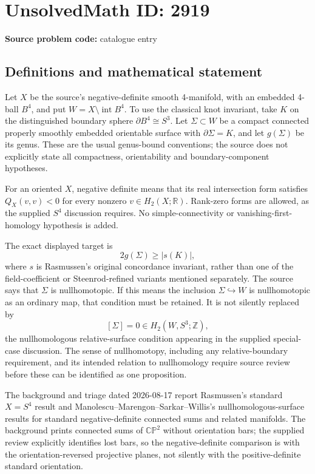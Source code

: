 \documentclass[11pt]{article}
\newcommand{\Z}{\mathbb{Z}}
\newcommand{\R}{\mathbb{R}}
\begin{document}
\section*{UnsolvedMath ID: 2919}
\textbf{Source problem code:} catalogue entry
\subsection{Definitions and mathematical statement}
Let \(X\) be the source's negative-definite smooth 4-manifold, with an embedded 4-ball \(B^4\), and put \(W=X\setminus\operatorname{int}B^4\). To use the classical knot invariant, take \(K\) on the distinguished boundary sphere \(\partial B^4\cong S^3\). Let \(\Sigma\subset W\) be a compact connected properly smoothly embedded orientable surface with \(\partial\Sigma=K\), and let \(g(\Sigma)\) be its genus. These are the usual genus-bound conventions; the source does not explicitly state all compactness, orientability and boundary-component hypotheses.

For an oriented \(X\), negative definite means that its real intersection form satisfies \(Q_X(v,v)<0\) for every nonzero \(v\in H_2(X;\R)\). Rank-zero forms are allowed, as the supplied \(S^4\) discussion requires. No simple-connectivity or vanishing-first-homology hypothesis is added.

The exact displayed target is
\[
2g(\Sigma)\geq|s(K)|,
\]
where \(s\) is Rasmussen's original concordance invariant, rather than one of the field-coefficient or Steenrod-refined variants mentioned separately. The source says that \(\Sigma\) is nullhomotopic. If this means the inclusion \(\Sigma\hookrightarrow W\) is nullhomotopic as an ordinary map, that condition must be retained. It is not silently replaced by
\[
[\Sigma]=0\in H_2(W,S^3;\Z),
\]
the nullhomologous relative-surface condition appearing in the supplied special-case discussion. The sense of nullhomotopy, including any relative-boundary requirement, and its intended relation to nullhomology require source review before these can be identified as one proposition.

The background and triage dated 2026-08-17 report Rasmussen's standard \(X=S^4\) result and Manolescu--Marengon--Sarkar--Willis's nullhomologous-surface results for standard negative-definite connected sums and related manifolds. The background prints connected sums of \(\mathbb{CP}^2\) without orientation bars; the supplied review explicitly identifies lost bars, so the negative-definite comparison is with the orientation-reversed projective planes, not silently with the positive-definite standard orientation.
\end{document}
